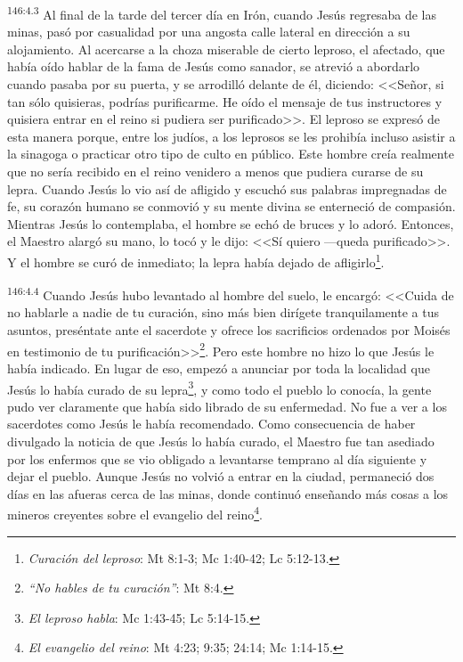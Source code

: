 \par 
\textsuperscript{146:4.3} Al final de la tarde del tercer día en Irón, cuando Jesús regresaba de las minas, pasó por casualidad por una angosta calle lateral en dirección a su alojamiento. Al acercarse a la choza miserable de cierto leproso, el afectado, que había oído hablar de la fama de Jesús como sanador, se atrevió a abordarlo cuando pasaba por su puerta, y se arrodilló delante de él, diciendo: <<Señor, si tan sólo quisieras, podrías purificarme. He oído el mensaje de tus instructores y quisiera entrar en el reino si pudiera ser purificado>>. El leproso se expresó de esta manera porque, entre los judíos, a los leprosos se les prohibía incluso asistir a la sinagoga o practicar otro tipo de culto en público. Este hombre creía realmente que no sería recibido en el reino venidero a menos que pudiera curarse de su lepra. Cuando Jesús lo vio así de afligido y escuchó sus palabras impregnadas de fe, su corazón humano se conmovió y su mente divina se enterneció de compasión. Mientras Jesús lo contemplaba, el hombre se echó de bruces y lo adoró. Entonces, el Maestro alargó su mano, lo tocó y le dijo: <<Sí quiero ---queda purificado>>. Y el hombre se curó de inmediato; la lepra había dejado de afligirlo\footnote{\textit{Curación del leproso}: Mt 8:1-3; Mc 1:40-42; Lc 5:12-13.}.

\par 
\textsuperscript{146:4.4} Cuando Jesús hubo levantado al hombre del suelo, le encargó: <<Cuida de no hablarle a nadie de tu curación, sino más bien dirígete tranquilamente a tus asuntos, preséntate ante el sacerdote y ofrece los sacrificios ordenados por Moisés en testimonio de tu purificación>>\footnote{\textit{``No hables de tu curación''}: Mt 8:4.}. Pero este hombre no hizo lo que Jesús le había indicado. En lugar de eso, empezó a anunciar por toda la localidad que Jesús lo había curado de su lepra\footnote{\textit{El leproso habla}: Mc 1:43-45; Lc 5:14-15.}, y como todo el pueblo lo conocía, la gente pudo ver claramente que había sido librado de su enfermedad. No fue a ver a los sacerdotes como Jesús le había recomendado. Como consecuencia de haber divulgado la noticia de que Jesús lo había curado, el Maestro fue tan asediado por los enfermos que se vio obligado a levantarse temprano al día siguiente y dejar el pueblo. Aunque Jesús no volvió a entrar en la ciudad, permaneció dos días en las afueras cerca de las minas, donde continuó enseñando más cosas a los mineros creyentes sobre el evangelio del reino\footnote{\textit{El evangelio del reino}: Mt 4:23; 9:35; 24:14; Mc 1:14-15.}.

